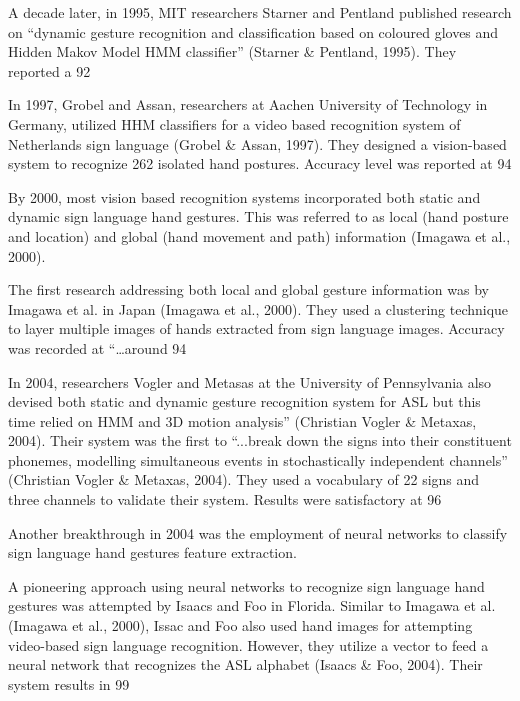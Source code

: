 A decade later, in 1995, MIT researchers Starner and Pentland published research on ``dynamic gesture recognition and classification based on coloured gloves and Hidden Makov Model HMM classifier'' (Starner & Pentland, 1995). They reported a 92%

In 1997, Grobel and Assan, researchers at Aachen University of Technology in Germany, utilized HHM classifiers for a video based recognition system of Netherlands sign language (Grobel & Assan, 1997). They designed a vision-based system to recognize 262 isolated hand postures. Accuracy level was reported at 94%

By 2000, most vision based recognition systems incorporated both static and dynamic sign language hand gestures. This was referred to as local (hand posture and location) and global (hand movement and path) information (Imagawa et al., 2000).

The first research addressing both local and global gesture information was by Imagawa et al. in Japan (Imagawa et al., 2000). They used a clustering technique to layer multiple images of hands extracted from sign language images. Accuracy was recorded at ``…around 94 %

In 2004, researchers Vogler and Metasas at the University of Pennsylvania also devised both static and dynamic gesture recognition system for ASL but this time relied on HMM and 3D motion analysis'' (Christian Vogler & Metaxas, 2004). Their system was the first to ``...break down the signs into their constituent phonemes, modelling simultaneous events in stochastically independent channels'' (Christian Vogler & Metaxas, 2004). They used a vocabulary of 22 signs and three channels to validate their system. Results were satisfactory at 96%

Another breakthrough in 2004 was the employment of neural networks to classify sign language hand gestures feature extraction. 

A pioneering approach using neural networks to recognize sign language hand gestures was attempted by Isaacs and Foo in Florida. Similar to Imagawa et al. (Imagawa et al., 2000), Issac and Foo also used hand images for attempting video-based sign language recognition. However, they utilize a vector to feed a neural network that recognizes the ASL alphabet (Isaacs & Foo, 2004). Their system results in 99%

